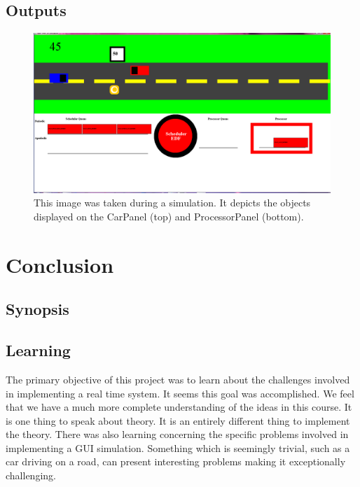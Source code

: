 \documentclass{article} %
\begin{document}
\subsection{Outputs}
\begin{figure}[!hbt]
\begin{center}
\includegraphics[width=\textwidth,keepaspectratio]{gui_car.png}
\end{center}
\caption{This image was taken during a simulation. It depicts the objects displayed on the CarPanel (top) and ProcessorPanel (bottom).}
\label{FIG-SIMULATION}
\end{figure}

\section{Conclusion}
\subsection{Synopsis}

\subsection{Learning}
The primary objective of this project was to learn about the challenges involved in implementing a real time system.
It seems this goal was accomplished. We feel that we have a much more complete understanding of the ideas in this course.
It is one thing to speak about theory. It is an entirely different thing to implement the theory.
There was also learning concerning the specific problems involved in implementing a GUI simulation.
Something which is seemingly trivial, such as a car driving on a road, can present interesting problems making it exceptionally challenging.
\end{document}
